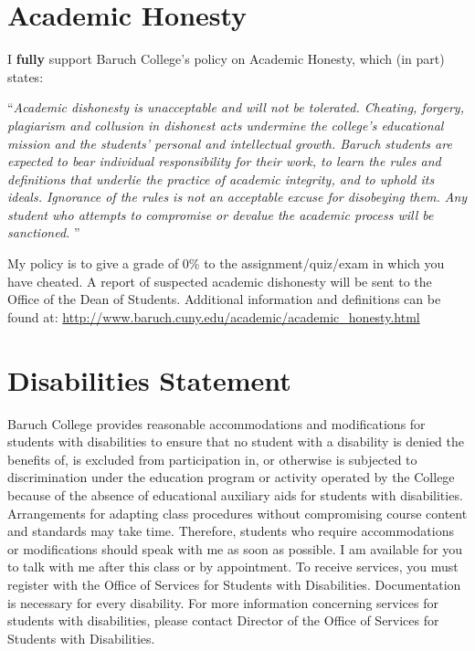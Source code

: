 \documentclass[12]{article}
\begin{document}
\section*{Academic Honesty}

I \textbf{fully} support Baruch College's policy on Academic Honesty, which (in part) states: 

``{\it Academic dishonesty is unacceptable and will not be tolerated. Cheating, forgery, plagiarism and collusion in dishonest acts undermine the college's educational mission and the students' personal and intellectual growth. Baruch students are expected to bear individual responsibility for their work, to learn the rules and definitions that underlie the practice of academic integrity, and to uphold its ideals. Ignorance of the rules is not an acceptable excuse for disobeying them. Any student who attempts to compromise or devalue the academic process will be sanctioned. }''

My policy is to give a grade of 0\% to the assignment/quiz/exam in which you have cheated.  
A report of suspected academic dishonesty will be sent to the Office
of the Dean of Students.
\newline
\newline
Additional information and definitions can be found at:
\newline
\href{https://www.baruch.cuny.edu/academic/academic_honesty.html}{http://www.baruch.cuny.edu/academic/academic\_honesty.html}

\section*{Disabilities Statement}

Baruch College provides reasonable accommodations and modifications for students with disabilities to ensure that no student with a disability is denied the benefits of, is excluded from participation in, or otherwise is subjected to discrimination under the education program or activity operated by the College because of the absence of educational auxiliary aids for students with disabilities. Arrangements for adapting class procedures without compromising course content and standards may take time. Therefore, students who require accommodations or modifications should speak with me as soon as possible.
\newline
\newline
I am available for you to talk with me after this class or by appointment.
\newline
\newline
To receive services, you must register with the Office of Services for Students with Disabilities. Documentation is necessary for every disability. For more information concerning services for students with disabilities, please contact Director of the Office of Services for Students with Disabilities.
\end{document}
